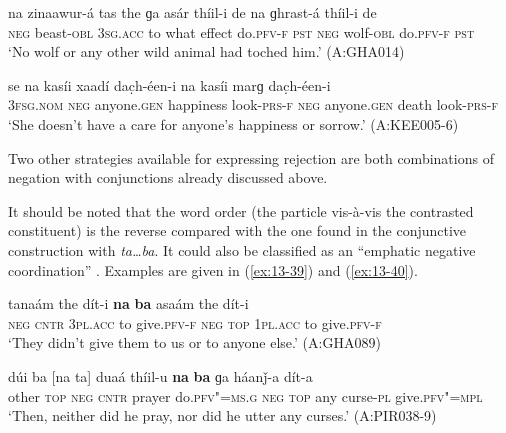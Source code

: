 \begin{exe}
\ex
\label{ex:13-37}
\gll na zinaawur-á tas the ɡa asár thíil-i de na ɡhrast-á thíil-i de \\
\textsc{neg} beast-\textsc{obl} \textsc{3sg.acc} to what effect do.\textsc{pfv-f} \textsc{pst}  \textsc{neg} wolf-\textsc{obl} do.\textsc{pfv-f} \textsc{pst} \\
\glt `No wolf or any other wild animal had toched him.' (A:GHA014)

\ex
\label{ex:13-38}
\gll se na kasíi xaadí dac̣h-éen-i na kasíi marɡ dac̣h-éen-i \\
\textsc{3fsg.nom} \textsc{neg} anyone.\textsc{gen} happiness look-\textsc{prs-f}  \textsc{neg} anyone.\textsc{gen} death look-\textsc{prs-f}  \\
\glt `She doesn't have a care for anyone's happiness or sorrow.' (A:KEE005-6) 
\end{exe}

Two other strategies available for expressing rejection are both combinations of negation with conjunctions already discussed above.


 It should be noted that the word order (the particle vis-à-vis the contrasted constituent) is the reverse compared with the one found in the conjunctive construction with \textit{ta{\ldots}ba}. It could also be classified as an ``emphatic negative coordination'' \citep[17--19]{haspelmath2007}. Examples are given in (\ref{ex:13-39}) and (\ref{ex:13-40}).

\begin{exe}
\ex
\label{ex:13-39}
\gll [na ta] tanaám the dít-i \textbf{na} \textbf{ba} asaám the dít-i \\
\textsc{neg} \textsc{cntr} \textsc{3pl.acc} to give.\textsc{pfv-f} \textsc{neg} \textsc{top} \textsc{1pl.acc} to give.\textsc{pfv-f}  \\
\glt `They didn't give them to us or to anyone else.' (A:GHA089)

\ex
\label{ex:13-40}
\gll dúi ba [na ta] duaá thíil-u \textbf{na} \textbf{ba} ɡa háanǰ-a dít-a\\
other \textsc{top} \textsc{neg} \textsc{cntr} prayer do.\textsc{pfv"=ms.g} \textsc{neg} \textsc{top} any curse-\textsc{pl} give.\textsc{pfv"=mpl}\\
\glt `Then, neither did he pray, nor did he utter any curses.' (A:PIR038-9) 
\end{exe}


